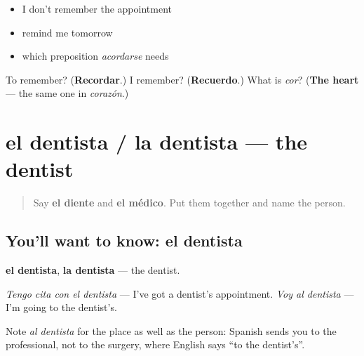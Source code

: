 \begin{itemize}
\raggedright
  \item I don't remember the appointment
  \item remind me tomorrow
  \item which preposition \emph{acordarse} needs
\end{itemize}

\begin{tcolorbox}[breakable,colback=teal!4,colframe=teal!35!black,title={Before you move on}]
To remember? (\textbf{Recordar}.) I remember? (\textbf{Recuerdo}.) What is \emph{cor}? (\textbf{The heart} — the same one in \emph{corazón}.)
\end{tcolorbox}
\section[el dentista / la dentista]{el dentista / la dentista — the dentist}

\label{lesson:ES-C464-dentista}



\begin{quote}
Say \textbf{el diente} and \textbf{el médico}. Put them together and name the person.
\end{quote}

\subsection*{You'll want to know: el dentista}
\textbf{el dentista}, \textbf{la dentista} — the dentist.

\emph{Tengo cita con el dentista} — I've got a dentist's appointment. \emph{Voy al dentista} — I'm going to the dentist's.

Note \emph{al dentista} for the place as well as the person: Spanish sends you to the professional, not to the surgery, where English says \textquotedblleft{}to the dentist's\textquotedblright{}.


